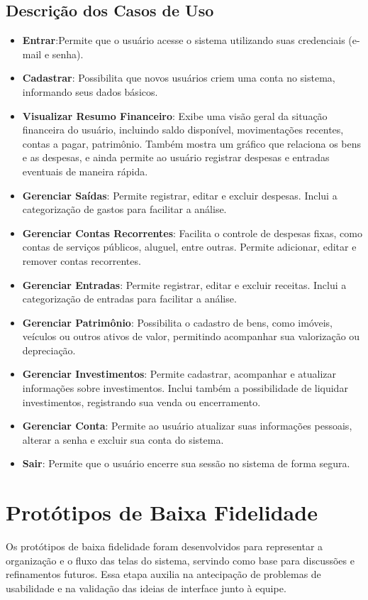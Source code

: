 \subsection{Descrição dos Casos de Uso}
\begin{itemize}
    \item \textbf{Entrar}:Permite que o usuário acesse o sistema utilizando suas credenciais (e-mail e senha).
    \item \textbf{Cadastrar}: Possibilita que novos usuários criem uma conta no sistema, informando seus dados básicos.
    \item \textbf{Visualizar Resumo Financeiro}: Exibe uma visão geral da situação financeira do usuário, incluindo saldo disponível, movimentações recentes, contas a pagar, patrimônio. Também mostra um gráfico que relaciona os bens e as despesas, e ainda permite ao usuário registrar despesas e entradas eventuais de maneira rápida.
    \item \textbf{Gerenciar Saídas}: Permite registrar, editar e excluir despesas. Inclui a categorização de gastos para facilitar a análise.
    \item \textbf{Gerenciar Contas Recorrentes}: Facilita o controle de despesas fixas, como contas de serviços públicos, aluguel, entre outras. Permite adicionar, editar e remover contas recorrentes.
    \item \textbf{Gerenciar Entradas}: Permite registrar, editar e excluir receitas. Inclui a categorização de entradas para facilitar a análise.
    \item \textbf{Gerenciar Patrimônio}: Possibilita o cadastro de bens, como imóveis, veículos ou outros ativos de valor, permitindo acompanhar sua valorização ou depreciação.
    \item \textbf{Gerenciar Investimentos}: Permite cadastrar, acompanhar e atualizar informações sobre investimentos. Inclui também a possibilidade de liquidar investimentos, registrando sua venda ou encerramento.
    \item \textbf{Gerenciar Conta}: Permite ao usuário atualizar suas informações pessoais, alterar a senha e excluir sua conta do sistema.
    \item \textbf{Sair}: Permite que o usuário encerre sua sessão no sistema de forma segura.
\end{itemize}

\section{Protótipos de Baixa Fidelidade}
Os protótipos de baixa fidelidade foram desenvolvidos para representar a organização e o fluxo das telas do sistema, servindo como base para discussões e refinamentos futuros. Essa etapa auxilia na antecipação de problemas de usabilidade e na validação das ideias de interface junto à equipe.

